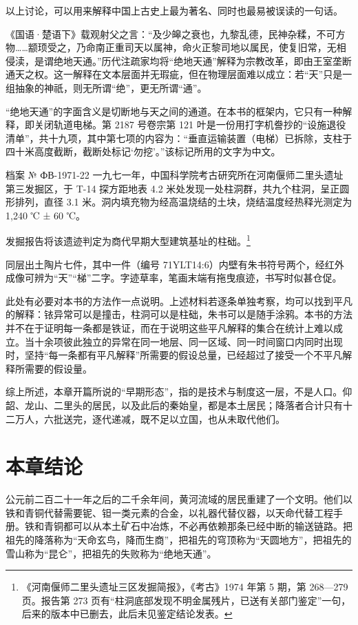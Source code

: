 以上讨论，可以用来解释中国上古史上最为著名、同时也最易被误读的一句话。

《国语·楚语下》载观射父之言：“及少皞之衰也，九黎乱德，民神杂糅，不可方物……颛顼受之，乃命南正重司天以属神，命火正黎司地以属民，使复旧常，无相侵渎，是谓绝地天通。”历代注疏家均将“绝地天通”解释为宗教改革，即由王室垄断通天之权。这一解释在文本层面并无瑕疵，但在物理层面难以成立：若“天”只是一组抽象的神祇，则无所谓“绝”，更无所谓“通”。

“绝地天通”的字面含义是切断地与天之间的通道。在本书的框架内，它只有一种解释，即关闭轨道电梯。第 2187 号卷宗第 121 叶是一份用打字机誊抄的“设施退役清单”，共十九项，其中第七项的内容为：“垂直运输装置（电梯）已拆除，支柱于四十米高度截断，截断处标记‘勿挖’。”该标记所用的文字为中文。

\begin{archive}{档案 № ФВ-1971-22}
一九七一年，中国科学院考古研究所在河南偃师二里头遗址第三发掘区，于 T-14 探方距地表 4.2 米处发现一处柱洞群，共九个柱洞，呈正圆形排列，直径 3.1 米。洞内填充物为经高温烧结的土块，烧结温度经热释光测定为 1{,}240 ℃ ± 60 ℃。

发掘报告将该遗迹判定为商代早期大型建筑基址的柱础。\footnote{《河南偃师二里头遗址三区发掘简报》，《考古》1974 年第 5 期，第 268—279 页。报告第 273 页有“柱洞底部发现不明金属残片，已送有关部门鉴定”一句，后来的版本中已删去，此后未见鉴定结论发表。}

同层出土陶片七件，其中一件（编号 71YLT14:6）内壁有朱书符号两个，经红外成像可辨为“天”“梯”二字。字迹草率，笔画末端有拖曳痕迹，书写时似甚仓促。
\end{archive}

此处有必要对本书的方法作一点说明。上述材料若逐条单独考察，均可以找到平凡的解释：铱异常可以是撞击，柱洞可以是柱础，朱书可以是随手涂鸦。本书的方法并不在于证明每一条都是铁证，而在于说明这些平凡解释的集合在统计上难以成立。当十余项彼此独立的异常在同一地层、同一区域、同一时间窗口内同时出现时，坚持“每一条都有平凡解释”所需要的假设总量，已经超过了接受一个不平凡解释所需要的假设量。

综上所述，本章开篇所说的“早期形态”，指的是技术与制度这一层，不是人口。仰韶、龙山、二里头的居民，以及此后的秦始皇，都是本土居民；降落者合计只有十二万人，六批送完，逐代递减，既不足以立国，也从未取代他们。

\section{本章结论}

公元前二百二十一年之后的二千余年间，黄河流域的居民重建了一个文明。他们以铁和青铜代替需要铌、钽一类元素的合金，以礼器代替仪器，以天命代替工程手册。铁和青铜都可以从本土矿石中冶炼，不必再依赖那条已经中断的输送链路。把祖先的降落称为“天命玄鸟，降而生商”，把祖先的穹顶称为“天圆地方”，把祖先的雪山称为“昆仑”，把祖先的失败称为“绝地天通”。

